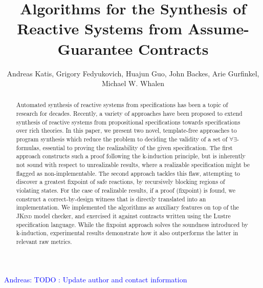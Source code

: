\documentclass[10pt,conference]{llncs}
\newcommand{\jkind}{\textsc{JKind}\xspace}
\newcommand{\andreas}[1]{\textcolor{blue}{Andreas: #1}}
\newcounter{template}
\begin{document}
\title{Algorithms for the Synthesis of Reactive Systems from Assume-Guarantee Contracts}
\andreas{TODO : Update author and contact information}
\author{Andreas Katis, Grigory Fedyukovich, Huajun Guo,
  John Backes, Arie Gurfinkel, Michael W. Whalen}%
 



\maketitle

\begin{abstract}
Automated synthesis of reactive systems from specifications has been a topic of research for decades.  Recently, a variety of approaches have been proposed to extend synthesis of reactive systems from propositional specifications towards specifications over rich theories.
In this paper, we present two novel, template-free approaches to program synthesis which reduce the problem to deciding the validity of a set of $\forall\exists$-formulas, essential to proving the realizability of the given specification.
The first approach constructs such a proof following the k-induction principle, but is inherently not sound with respect to unrealizable results, where a realizable specification might be flagged as non-implementable. The second approach tackles this flaw, attempting to discover a greatest fixpoint of safe reactions, by recursively blocking regions of violating states. For the case of realizable results, if a proof (fixpoint) is found, we construct a correct-by-design witness that is directly translated into an implementation.
We implemented the algorithms as auxiliary features on top of the \jkind model checker, and exercised it against contracts written using the Lustre specification language.
While the fixpoint approach solves the soundness introduced by k-induction, experimental results demonstrate how it also outperforms the latter in relevant raw metrics.
\end{abstract}
\end{document}

